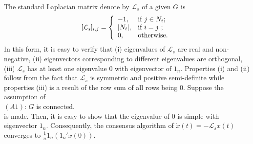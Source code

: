 \documentclass[onecolumn,reviewcopy]{autart}
\def \L{\mathcal{L}}
\begin{document}
The standard Laplacian matrix denote by $\L_s$ of a given $G$ is
\begin{align} \label{eqn:Lii}
[\L_s]_{i,j}=\left\{
  \begin{array}{ll}
    -1, & \hbox{if $j \in N_i$;} \\
    |N_i|, & \hbox{if $i=j$ ;} \\
    0, & \hbox{otherwise.}
  \end{array}
\right.
\end{align}
In this form, it is easy to verify that (i) eigenvalues of $\L_s$ are real and non-negative, (ii) eigenvectors corresponding to different eigenvalues are orthogonal, (iii) $\L_s$ has at least one eigenvalue $0$ with eigenvector of $1_n$. Properties (i) and (ii) follow from the fact that $\L_s$ is symmetric and positive semi-definite while properties (iii) is a result of the row sum of all rows being $0$.
Suppose the assumption of \\
$(A1)$: $G$ is connected. \\
is made. Then, it is easy to show that the eigenvalue of $0$ is simple with eigenvector $1_n$. Consequently, the consensus algorithm of
$\dot{x}(t)=-\L_s x(t)$ converges to $\frac{1}{n} 1_n (1_n' x(0))$.
\end{document}
